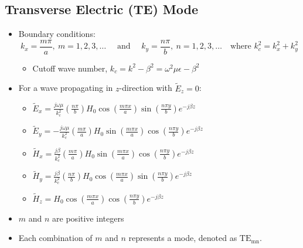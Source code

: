 \documentclass[a4paper]{article}
\begin{document}
\subsection{Transverse Electric (TE) Mode}
\begin{itemize}
    \item Boundary conditions:
    $$k_x = \frac{m\pi}{a},\ m=1, 2, 3,\ldots\quad\text{ and }\quad k_y = \frac{n\pi}{b},\ n=1, 2, 3,\ldots\quad\text{where }k_c^2 = k_x^2+k_y^2$$
    \begin{itemize}[label=$\circ$]
        \item Cutoff wave number, $k_c = k^2-\beta^2 = \omega^2\mu\epsilon-\beta^2$
    \end{itemize}
    \item For a wave propagating in $z$-direction with $\widetilde{E}_z = 0$:
    \begin{itemize}[label=$\circ$]
        \item $\widetilde{E}_x =  \displaystyle\frac{j\omega\mu}{k_c^2}\left(\displaystyle\frac{n\pi}{b}\right)H_0\cos\left(\displaystyle\frac{m\pi x}{a}\right)\sin\left(\displaystyle\frac{n\pi y}{b}\right)e^{-j\beta z}$
        \item $\widetilde{E}_y = - \displaystyle\frac{j\omega\mu}{k_c^2}\left(\displaystyle\frac{m\pi}{a}\right)H_0\sin\left(\displaystyle\frac{m\pi x}{a}\right)\cos\left(\displaystyle\frac{n\pi y}{b}\right)e^{-j\beta z}$
        \item $\widetilde{H}_x = \displaystyle\frac{j\beta}{k_c^2}\left(\displaystyle\frac{m\pi}{a}\right)H_0\sin\left(\displaystyle\frac{m\pi x}{a}\right)\cos\left(\displaystyle\frac{n\pi y}{b}\right)e^{-j\beta z}$
        \item $\widetilde{H}_y = \displaystyle\frac{j\beta}{k_c^2}\left(\displaystyle\frac{n\pi}{b}\right)H_0\cos\left(\displaystyle\frac{m\pi x}{a}\right)\sin\left(\displaystyle\frac{n\pi y}{b}\right)e^{-j\beta z}$
        \item $\widetilde{H}_z = H_0\cos\left(\displaystyle\frac{m\pi x}{a}\right)\cos\left(\displaystyle\frac{n\pi y}{b}\right)e^{-j\beta z}$
    \end{itemize}
    \item $m$ and $n$ are positive integers
    \item Each combination of $m$ and $n$ represents a mode, denoted as $\text{TE}_\text{mn}$.
\end{itemize}
\end{document}
